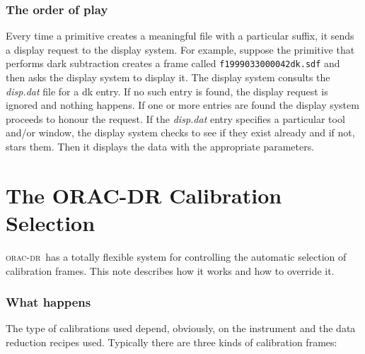 \documentclass[twoside,11pt]{article}
\renewcommand{\_}{\texttt{\symbol{95}}}
\newcommand{\oracdr}{\textsc{orac-dr}}
\begin{document}
\subsubsection*{The order of play\label{The_ORAC-DR_Display_System_The_order_of_play}}

Every time a primitive creates a meaningful file with a particular
suffix, it sends a display request to the display system. For example, 
suppose the primitive that performs dark subtraction creates a frame
called \texttt{f19990330\_00042\_dk.sdf} and then asks the display system to
display it. The display system consults the \emph{disp.dat} file for a dk
entry. If no such entry is found, the display request is ignored and
nothing happens. If one or more entries are found the display system
proceeds to honour the request. If the \emph{disp.dat} entry specifies a
particular tool and/or window, the display system checks to see if
they exist already and if not, stars them. Then it displays the data
with the appropriate parameters.


\section{The ORAC-DR Calibration Selection\label{The_ORAC-DR_Calibration_Selection}}


\oracdr\ has a totally flexible system for controlling the automatic
selection of calibration frames. This note describes how it works and
how to override it.

\subsubsection*{What happens\label{The_ORAC-DR_Calibration_Selection_What_happens}}

The type of calibrations used depend, obviously, on the instrument and
the data reduction recipes used. Typically there are three kinds of
calibration frames:
\end{document}
